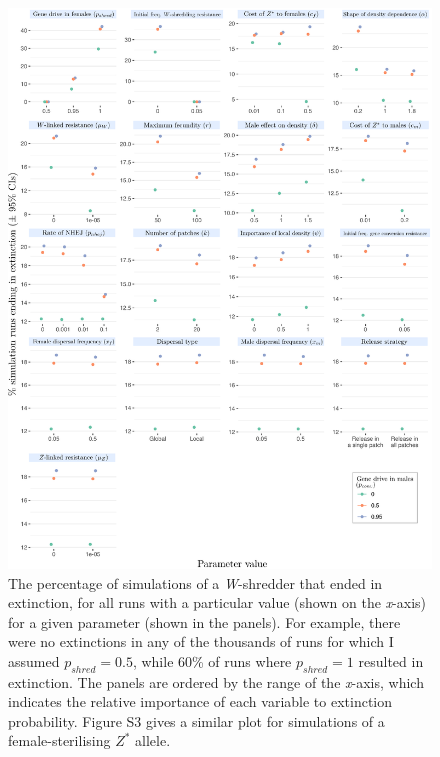 \documentclass[]{rsos}%
\begin{document}
\begin{figure}[h]
\centering
\includegraphics[width=1.0\textwidth]{../figures/figure3_inkscape.eps}
\caption{\footnotesize{The percentage of simulations of a \textit{W}-shredder that ended in extinction, for all runs with a particular value (shown on the \textit{x}-axis) for a given parameter (shown in the panels). For example, there were no extinctions in any of the thousands of runs for which I assumed $p_{shred} = 0.5$, while 60\% of runs where $p_{shred} = 1$ resulted in extinction. The panels are ordered by the range of the \textit{x}-axis, which indicates the relative importance of each variable to extinction probability. Figure S3 gives a similar plot for simulations of a female-sterilising $Z^*$ allele.}}
\end{figure}
\newpage
\end{document}
